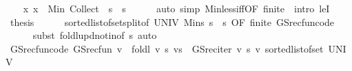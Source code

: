 \begin{isabellebody}
\ \ \isamarkupfalse%
\ {\isachardoublequoteopen}{\isacharbraceleft}{\kern0pt}x{\isachardot}{\kern0pt}\ x\ {\isacharless}{\kern0pt}\ Min\ {\isacharparenleft}{\kern0pt}Collect\ {\isacharparenleft}{\kern0pt}{\isacharparenleft}{\kern0pt}{\isacharless}{\kern0pt}{\isacharparenright}{\kern0pt}\ s{\isacharparenright}{\kern0pt}{\isacharparenright}{\kern0pt}{\isacharbraceright}{\kern0pt}\ {\isacharequal}{\kern0pt}\ {\isacharbraceleft}{\kern0pt}{\isachardot}{\kern0pt}{\isachardot}{\kern0pt}s{\isacharbraceright}{\kern0pt}{\isachardoublequoteclose}\isanewline
\ \ \ \ \isamarkupfalse%
\ {\isacharparenleft}{\kern0pt}auto\ simp{\isacharcolon}{\kern0pt}\ Min{\isacharunderscore}{\kern0pt}less{\isacharunderscore}{\kern0pt}iff{\isacharbrackleft}{\kern0pt}OF\ finite\ {\isacharasterisk}{\kern0pt}{\isacharbrackright}{\kern0pt}\ intro{\isacharcolon}{\kern0pt}\ leI{\isacharparenright}{\kern0pt}\isanewline
\ \ \isamarkupfalse%
\ \isamarkupfalse%
\ {\isacharquery}{\kern0pt}thesis\isanewline
\ \ \ \ \isamarkupfalse%
\ sorted{\isacharunderscore}{\kern0pt}list{\isacharunderscore}{\kern0pt}of{\isacharunderscore}{\kern0pt}set{\isacharunderscore}{\kern0pt}split{\isacharbrackleft}{\kern0pt}of\ UNIV\ {\isachardoublequoteopen}Min{\isacharbraceleft}{\kern0pt}s{\isacharprime}{\kern0pt}{\isachardot}{\kern0pt}\ s\ {\isacharless}{\kern0pt}\ s{\isacharprime}{\kern0pt}{\isacharbraceright}{\kern0pt}{\isachardoublequoteclose}{\isacharcomma}{\kern0pt}\ OF\ finite{\isacharbrackright}{\kern0pt}\ GS{\isacharunderscore}{\kern0pt}rec{\isacharunderscore}{\kern0pt}fun{\isacharunderscore}{\kern0pt}code\ \isanewline
\ \ \ \ \isamarkupfalse%
\ {\isacharparenleft}{\kern0pt}subst\ foldl{\isacharunderscore}{\kern0pt}upd{\isacharunderscore}{\kern0pt}notin{\isacharprime}{\kern0pt}{\isacharbrackleft}{\kern0pt}of\ s{\isacharbrackright}{\kern0pt}{\isacharparenright}{\kern0pt}\ auto\isanewline
{}\isamarkupfalse%
%
\endisatagproof
{\isafoldproof}%
%
\isadelimproof
\isanewline
%
\endisadelimproof
\isanewline
{}\isamarkupfalse%
\ GS{\isacharunderscore}{\kern0pt}rec{\isacharunderscore}{\kern0pt}fun{\isacharunderscore}{\kern0pt}code{\isacharprime}{\kern0pt}{\isacharprime}{\kern0pt}{\isacharcolon}{\kern0pt}\ {\isachardoublequoteopen}GS{\isacharunderscore}{\kern0pt}rec{\isacharunderscore}{\kern0pt}fun\ v\ {\isacharequal}{\kern0pt}\ foldl\ {\isacharparenleft}{\kern0pt}{\isasymlambda}v\ s{\isachardot}{\kern0pt}\ v{\isacharparenleft}{\kern0pt}s\ {\isacharcolon}{\kern0pt}{\isacharequal}{\kern0pt}\ GS{\isacharunderscore}{\kern0pt}rec{\isacharunderscore}{\kern0pt}iter\ v\ s{\isacharparenright}{\kern0pt}{\isacharparenright}{\kern0pt}\ v\ {\isacharparenleft}{\kern0pt}sorted{\isacharunderscore}{\kern0pt}list{\isacharunderscore}{\kern0pt}of{\isacharunderscore}{\kern0pt}set\ UNIV{\isacharparenright}{\kern0pt}{\isachardoublequoteclose}\isanewline

\end{isabellebody}
